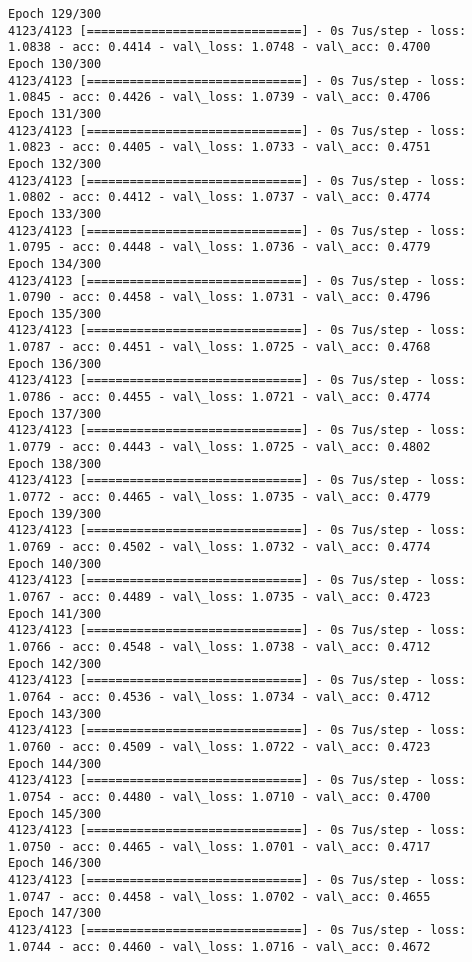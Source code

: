 \documentclass[11pt]{article}
\begin{document}
\begin{Verbatim}[commandchars=\\\{\}]
Epoch 129/300
4123/4123 [==============================] - 0s 7us/step - loss: 1.0838 - acc: 0.4414 - val\_loss: 1.0748 - val\_acc: 0.4700
Epoch 130/300
4123/4123 [==============================] - 0s 7us/step - loss: 1.0845 - acc: 0.4426 - val\_loss: 1.0739 - val\_acc: 0.4706
Epoch 131/300
4123/4123 [==============================] - 0s 7us/step - loss: 1.0823 - acc: 0.4405 - val\_loss: 1.0733 - val\_acc: 0.4751
Epoch 132/300
4123/4123 [==============================] - 0s 7us/step - loss: 1.0802 - acc: 0.4412 - val\_loss: 1.0737 - val\_acc: 0.4774
Epoch 133/300
4123/4123 [==============================] - 0s 7us/step - loss: 1.0795 - acc: 0.4448 - val\_loss: 1.0736 - val\_acc: 0.4779
Epoch 134/300
4123/4123 [==============================] - 0s 7us/step - loss: 1.0790 - acc: 0.4458 - val\_loss: 1.0731 - val\_acc: 0.4796
Epoch 135/300
4123/4123 [==============================] - 0s 7us/step - loss: 1.0787 - acc: 0.4451 - val\_loss: 1.0725 - val\_acc: 0.4768
Epoch 136/300
4123/4123 [==============================] - 0s 7us/step - loss: 1.0786 - acc: 0.4455 - val\_loss: 1.0721 - val\_acc: 0.4774
Epoch 137/300
4123/4123 [==============================] - 0s 7us/step - loss: 1.0779 - acc: 0.4443 - val\_loss: 1.0725 - val\_acc: 0.4802
Epoch 138/300
4123/4123 [==============================] - 0s 7us/step - loss: 1.0772 - acc: 0.4465 - val\_loss: 1.0735 - val\_acc: 0.4779
Epoch 139/300
4123/4123 [==============================] - 0s 7us/step - loss: 1.0769 - acc: 0.4502 - val\_loss: 1.0732 - val\_acc: 0.4774
Epoch 140/300
4123/4123 [==============================] - 0s 7us/step - loss: 1.0767 - acc: 0.4489 - val\_loss: 1.0735 - val\_acc: 0.4723
Epoch 141/300
4123/4123 [==============================] - 0s 7us/step - loss: 1.0766 - acc: 0.4548 - val\_loss: 1.0738 - val\_acc: 0.4712
Epoch 142/300
4123/4123 [==============================] - 0s 7us/step - loss: 1.0764 - acc: 0.4536 - val\_loss: 1.0734 - val\_acc: 0.4712
Epoch 143/300
4123/4123 [==============================] - 0s 7us/step - loss: 1.0760 - acc: 0.4509 - val\_loss: 1.0722 - val\_acc: 0.4723
Epoch 144/300
4123/4123 [==============================] - 0s 7us/step - loss: 1.0754 - acc: 0.4480 - val\_loss: 1.0710 - val\_acc: 0.4700
Epoch 145/300
4123/4123 [==============================] - 0s 7us/step - loss: 1.0750 - acc: 0.4465 - val\_loss: 1.0701 - val\_acc: 0.4717
Epoch 146/300
4123/4123 [==============================] - 0s 7us/step - loss: 1.0747 - acc: 0.4458 - val\_loss: 1.0702 - val\_acc: 0.4655
Epoch 147/300
4123/4123 [==============================] - 0s 7us/step - loss: 1.0744 - acc: 0.4460 - val\_loss: 1.0716 - val\_acc: 0.4672

\end{Verbatim}
\end{document}
